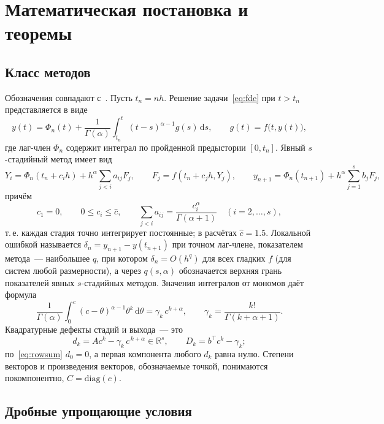 \documentclass[11pt,a4paper]{article}
\theoremstyle{plain}
\theoremstyle{definition}
\newcommand{\G}{\Gamma}
\newcommand{\dd}{\,\mathrm{d}}
\begin{document}
\section{Математическая постановка и теоремы}

\subsection{Класс методов}

Обозначения совпадают с~\cite{PrikBarriers}. Пусть $t_n=nh$. Решение задачи~\eqref{eq:fde} при $t>t_n$ представляется в виде
\begin{equation}\label{eq:split}
y(t)=\Phi_n(t)+\frac{1}{\G(\alpha)}\int_{t_n}^{t}(t-s)^{\alpha-1}g(s)\dd s ,\qquad g(t)=f\bigl(t,y(t)\bigr),
\end{equation}
где лаг-член $\Phi_n$ содержит интеграл по пройденной предыстории $[0,t_n]$. Явный $s$-стадийный метод имеет вид
\begin{equation}\label{eq:method}
Y_i=\Phi_n(t_n+c_ih)+h^{\alpha}\sum_{j<i}a_{ij}F_j,\qquad F_j=f(t_n+c_jh,Y_j),\qquad
y_{n+1}=\Phi_n(t_{n+1})+h^{\alpha}\sum_{j=1}^{s}b_jF_j ,
\end{equation}
причём
\begin{equation}\label{eq:rowsum}
c_1=0,\qquad 0\le c_i\le\hat c,\qquad \sum_{j<i}a_{ij}=\frac{c_i^{\alpha}}{\G(\alpha+1)}\quad(i=2,\dots,s),
\end{equation}
т.\,е. каждая стадия точно интегрирует постоянные; в расчётах $\hat c=1.5$. Локальной ошибкой называется $\delta_n=y_{n+1}-y(t_{n+1})$ при точном лаг-члене, показателем метода~--- наибольшее $q$, при котором $\delta_n=O(h^q)$ для всех гладких $f$ (для систем любой размерности), а через $q(s,\alpha)$ обозначается верхняя грань показателей явных $s$-стадийных методов. Значения интегралов от мономов даёт формула
\begin{equation}\label{eq:beta}
\frac{1}{\G(\alpha)}\int_0^{c}(c-\theta)^{\alpha-1}\theta^k\dd\theta=\gamma_k\,c^{k+\alpha},\qquad \gamma_k=\frac{k!}{\G(k+\alpha+1)} .
\end{equation}
Квадратурные дефекты стадий и выхода~--- это
\[
d_k=Ac^k-\gamma_k\,c^{\,k+\alpha}\in\mathbb R^s,\qquad D_k=b^{\top}c^k-\gamma_k ;
\]
по~\eqref{eq:rowsum} $d_0=0$, а первая компонента любого $d_k$ равна нулю. Степени векторов и произведения векторов, обозначаемые точкой, понимаются покомпонентно, $C=\mathrm{diag}(c)$.



\subsection{Дробные упрощающие условия}\label{sec:simpl}
\end{document}
